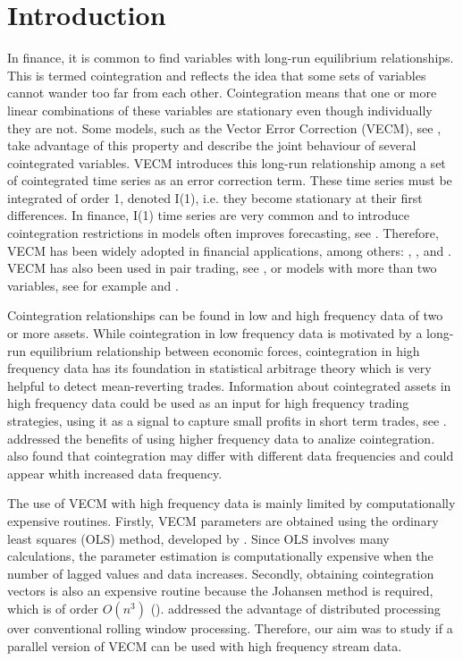 \section{Introduction}
\label{sec:introduction}
In finance, it is common to find variables with long-run equilibrium
relationships. This is termed cointegration and reflects the idea that some sets
of variables cannot wander too far from each other. Cointegration means that one
or more linear combinations of these variables are stationary even though
individually they are not. Some models, such as the Vector Error Correction
(VECM), see \cite{engle87}, take advantage of this property and describe the
joint behaviour of several cointegrated variables. VECM introduces this long-run
relationship among a set of cointegrated time series as an error correction
term. These time series must be integrated of order 1, denoted I(1), i.e. they
become stationary at their first differences. In finance, I(1) time series are
very common and to introduce cointegration restrictions in models often improves
forecasting, see \cite{duy1998}. Therefore, VECM has been widely adopted in
financial applications, among others: \cite{mukherjee1995}, \cite{seong2013},
\cite{maysami2000} and \cite{arestis2001}. VECM has also been used in pair
trading, see \cite{herlemont2003}, or models with more than two variables, see
for example \cite{mukherjee1995} and \cite{engle2004}.

Cointegration relationships can be found in low and high frequency data of two or
more assets. While cointegration in low frequency data is motivated by a
long-run equilibrium relationship between economic forces, cointegration in high
frequency data has its foundation in statistical arbitrage theory which is very helpful
to detect mean-reverting trades. Information about cointegrated assets in high
frequency data could be used as an input for high frequency trading strategies,
using it as a signal to capture small profits in short term trades, see
\cite{miao2014}. \cite{zhou2001} addressed the benefits of using higher
frequency data to analize cointegration. \cite{rittler2012} also found that
cointegration may differ with different data frequencies and could appear
whith increased data frequency.

The use of VECM with high frequency data is mainly limited by computationally
expensive routines. Firstly, VECM parameters are obtained using the ordinary
least squares (OLS) method, developed by \cite{golub1980}. Since OLS involves
many calculations, the parameter estimation is computationally expensive when
the number of lagged values and data increases. Secondly, obtaining
cointegration vectors is also an expensive routine because the Johansen method 
is required, which is of order $O(n^3)$ (\cite{johansen1995}).
\cite{chen2003} addressed the advantage of distributed processing over
conventional rolling window processing. Therefore, our aim was to study if a
parallel version of VECM can be used with high frequency stream data. 

